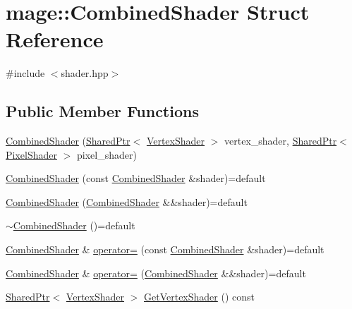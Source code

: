 \hypertarget{structmage_1_1_combined_shader}{}\section{mage\+:\+:Combined\+Shader Struct Reference}
\label{structmage_1_1_combined_shader}


{\ttfamily \#include $<$shader.\+hpp$>$}

\subsection*{Public Member Functions}
\begin{DoxyCompactItemize}
\item 
\hyperlink{structmage_1_1_combined_shader_ab9d6ce4dc9ed2602b19729ee8d126f61}{Combined\+Shader} (\hyperlink{namespacemage_a1e01ae66713838a7a67d30e44c67703e}{Shared\+Ptr}$<$ \hyperlink{classmage_1_1_vertex_shader}{Vertex\+Shader} $>$ vertex\+\_\+shader, \hyperlink{namespacemage_a1e01ae66713838a7a67d30e44c67703e}{Shared\+Ptr}$<$ \hyperlink{classmage_1_1_pixel_shader}{Pixel\+Shader} $>$ pixel\+\_\+shader)
\item 
\hyperlink{structmage_1_1_combined_shader_afc4a237b78efe6b13d6e569ede301b62}{Combined\+Shader} (const \hyperlink{structmage_1_1_combined_shader}{Combined\+Shader} \&shader)=default
\item 
\hyperlink{structmage_1_1_combined_shader_a74c1a44f6b1ec3cc1734b18b337441d3}{Combined\+Shader} (\hyperlink{structmage_1_1_combined_shader}{Combined\+Shader} \&\&shader)=default
\item 
\hyperlink{structmage_1_1_combined_shader_a6b1767d2525724f2f9120df87253973e}{$\sim$\+Combined\+Shader} ()=default
\item 
\hyperlink{structmage_1_1_combined_shader}{Combined\+Shader} \& \hyperlink{structmage_1_1_combined_shader_a14859fb597c07309fd269b56af373c02}{operator=} (const \hyperlink{structmage_1_1_combined_shader}{Combined\+Shader} \&shader)=default
\item 
\hyperlink{structmage_1_1_combined_shader}{Combined\+Shader} \& \hyperlink{structmage_1_1_combined_shader_ad05cf0e2c4f0cd7d37ad5be971aefd1b}{operator=} (\hyperlink{structmage_1_1_combined_shader}{Combined\+Shader} \&\&shader)=default
\item 
\hyperlink{namespacemage_a1e01ae66713838a7a67d30e44c67703e}{Shared\+Ptr}$<$ \hyperlink{classmage_1_1_vertex_shader}{Vertex\+Shader} $>$ \hyperlink{structmage_1_1_combined_shader_a57d05ca7f8982d4f078f5d7fef506fd8}{Get\+Vertex\+Shader} () const

\end{DoxyCompactItemize}
